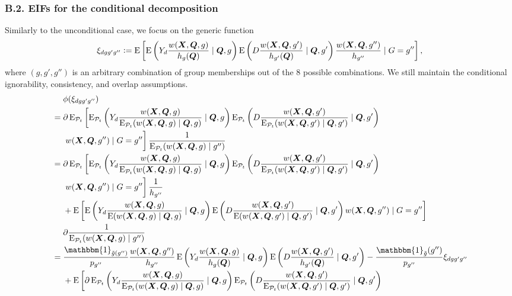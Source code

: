 \documentclass[12pt,a4paper]{article}
\newcommand{\E}{\operatorname{E}}
\def\X{{\boldsymbol X}}
\def\Q{{\boldsymbol Q}}
\def\one{\mathbbm{1}}
\newcommand{\defeq}{\vcentcolon=}
\def\pheight{\frac{w(\X,\Q,g')}{\E_{\mathcal{P}_t}(w(\X,\Q,g') \mid \Q,g')}}
\begin{document}
\subsubsection*{B.2. EIFs for the conditional decomposition}
Similarly to the unconditional case, we focus on the generic function
$$\xi_{dgg'g''} \defeq \E \left[\E \left(Y_d \frac{w(\X,\Q,g)}{h_{g}(\Q)}  \mid \Q, g \right) \E \left(D \frac{w(\X,\Q,g')}{h_{g'}(\Q)} \mid \Q, g' \right) \frac{w(\X,\Q,g'')}{h_{g''}}  \mid G=g'' \right],$$
where $(g,g',g'')$ is an arbitrary combination of group memberships out of the 8 possible combinations. We still maintain the conditional ignorability, consistency, and overlap assumptions.  
\begin{align*}
    &\phantom{{}={}} \phi(\xi_{dgg'g''}) \\
    &= \partial \E_{\mathcal{P}_t} \left[\E_{\mathcal{P}_t} \left(Y_d \frac{w(\X,\Q,g)}{\E_{\mathcal{P}_t}(w(\X,\Q,g) \mid \Q,g)}  \mid \Q, g \right) \E_{\mathcal{P}_t} \left(D \frac{w(\X,\Q,g')}{\E_{\mathcal{P}_t}(w(\X,\Q,g') \mid \Q,g')} \mid \Q, g' \right) \right. \\ 
    &\phantom{{}={}} \left. \vphantom{\pheight}
    w(\X,\Q,g'') \mid G=g'' \right] \frac{1}{\E_{\mathcal{P}_t}(w(\X,\Q,g) \mid g'')} \\
    &= \partial \E_{\mathcal{P}_t} \left[\E_{\mathcal{P}_t} \left(Y_d \frac{w(\X,\Q,g)}{\E_{\mathcal{P}_t}(w(\X,\Q,g) \mid \Q,g)}  \mid \Q, g \right) \E_{\mathcal{P}_t} \left(D \frac{w(\X,\Q,g')}{\E_{\mathcal{P}_t}(w(\X,\Q,g') \mid \Q,g')} \mid \Q, g' \right) \right. \\ 
    &\phantom{{}={}} \left. \vphantom{\pheight}
    w(\X,\Q,g'') \mid G=g'' \right] \frac{1}{h_{g''}} \\
    &\phantom{{}={}} + \E \left[\E \left(Y_d \frac{w(\X,\Q,g)}{\E(w(\X,\Q,g) \mid \Q,g)}  \mid \Q, g \right) \E \left(D \frac{w(\X,\Q,g')}{\E(w(\X,\Q,g') \mid \Q,g')} \mid \Q, g' \right) 
    w(\X,\Q,g'') \mid G=g'' \right] \\
    &\phantom{{}={}} \partial \frac{1}{\E_{\mathcal{P}_t}(w(\X,\Q,g) \mid g'')} \\
    &=\frac{\one_{\Tilde{g}(g'')}}{p_{g''}}\frac{w(\X,\Q,g'')}{h_{g''}} \E \left(Y_d \frac{w(\X,\Q,g)}{h_{g}(\Q)}  \mid \Q, g \right) \E \left(D \frac{w(\X,\Q,g')}{h_{g'}(\Q)} \mid \Q, g' \right) - \frac{\one_{\Tilde{g}}(g'')}{p_{g''}}\xi_{dgg'g''} \\
    &\phantom{{}={}} + \E \left[\partial \E_{\mathcal{P}_t} \left(Y_d \frac{w(\X,\Q,g)}{\E_{\mathcal{P}_t}(w(\X,\Q,g) \mid \Q,g)}  \mid \Q, g \right) \E_{\mathcal{P}_t} \left(D \frac{w(\X,\Q,g')}{\E_{\mathcal{P}_t}(w(\X,\Q,g') \mid \Q,g')} \mid \Q, g' \right) \right. \\ 

\end{align*}
\end{document}
